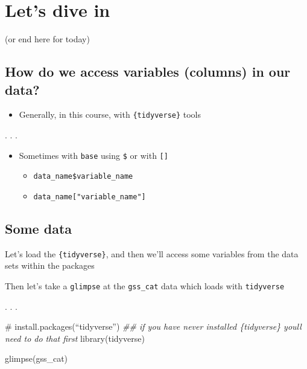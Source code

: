 \documentclass[
  letterpaper,
  DIV=11,
  numbers=noendperiod,
  oneside]{scrartcl}
\newenvironment{Shaded}{\begin{snugshade}}{\end{snugshade}}
\newcommand{\CommentTok}[1]{\textcolor[rgb]{0.37,0.37,0.37}{#1}}
\newcommand{\DocumentationTok}[1]{\textcolor[rgb]{0.37,0.37,0.37}{\textit{#1}}}
\newcommand{\FunctionTok}[1]{\textcolor[rgb]{0.28,0.35,0.67}{#1}}
\newcommand{\NormalTok}[1]{\textcolor[rgb]{0.00,0.23,0.31}{#1}}
\providecommand{\tightlist}{%
  \setlength{\itemsep}{0pt}\setlength{\parskip}{0pt}}\usepackage{longtable,booktabs,array}
\begin{document}
\hypertarget{lets-dive-in}{%
\section{Let's dive in}\label{lets-dive-in}}

(or end here for today)

\hypertarget{how-do-we-access-variables-columns-in-our-data}{%
\subsection{How do we access variables (columns) in our
data?}\label{how-do-we-access-variables-columns-in-our-data}}

\begin{itemize}
\tightlist
\item
  Generally, in this course, with \texttt{\{tidyverse\}} tools
\end{itemize}

. . .

\begin{itemize}
\tightlist
\item
  Sometimes with \texttt{base} using \texttt{\$} or with \texttt{{[}{]}}

  \begin{itemize}
  \tightlist
  \item
    \texttt{data\_name\$variable\_name}
  \item
    \texttt{data\_name{[}"variable\_name"{]}}
  \end{itemize}
\end{itemize}

\hypertarget{some-data}{%
\subsection{Some data}\label{some-data}}

Let's load the \texttt{\{tidyverse\}}, and then we'll access some
variables from the data sets within the packages

Then let's take a \texttt{glimpse} at the \texttt{gss\_cat} data which
loads with \texttt{tidyverse}

. . .

\begin{Shaded}
\begin{Highlighting}[]
\CommentTok{\# install.packages(“tidyverse”) }
\DocumentationTok{\#\# if you have never installed \{tidyverse\} you\textquotesingle{}ll need to do that first}
\FunctionTok{library}\NormalTok{(tidyverse)}

\FunctionTok{glimpse}\NormalTok{(gss\_cat)}
\end{Highlighting}
\end{Shaded}
\end{document}
